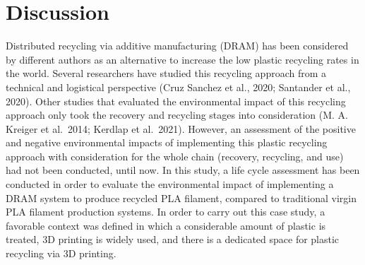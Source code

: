 \documentclass[]{elsarticle} %
\begin{document}
\hypertarget{discussion}{%
\section{Discussion}\label{discussion}}

Distributed recycling via additive manufacturing (DRAM) has been considered by different authors as an alternative to increase the low plastic recycling rates in the world. Several researchers have studied this recycling approach from a technical and logistical perspective (Cruz Sanchez et al., 2020; Santander et al., 2020). Other studies that evaluated the environmental impact of this recycling approach only took the recovery and recycling stages into consideration (M. A. Kreiger et al.~2014; Kerdlap et al.~2021). However, an assessment of the positive and negative environmental impacts of implementing this plastic recycling approach with consideration for the whole chain (recovery, recycling, and use) had not been conducted, until now.
In this study, a life cycle assessment has been conducted in order to evaluate the environmental impact of implementing a DRAM system to produce recycled PLA filament, compared to traditional virgin PLA filament production systems. In order to carry out this case study, a favorable context was defined in which a considerable amount of plastic is treated, 3D printing is widely used, and there is a dedicated space for plastic recycling via 3D printing.
\end{document}
